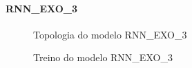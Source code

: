 \documentclass[	12pt, Times, openright, twoside, a4paper, english, brazil]{abntex2}
\begin{document}
              \paragraph{RNN\_EXO\_3}
                \begin{figure}[!ht]
                  \caption{Topologia do modelo RNN\_EXO\_3 \label{fig:case1_rnn_exo_3} }
                \end{figure}

                \begin{figure}[!ht]
                  \caption{Treino do modelo RNN\_EXO\_3 \label{fig:case1_rnn_exo_3_train} }
                \end{figure}
\end{document}
